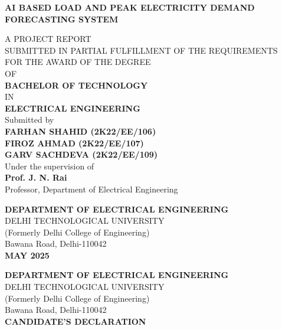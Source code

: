 \documentclass[12pt,a4paper,openany]{report}
\begin{document}
\thispagestyle{empty}
\begin{center}
\vspace*{6pt}
{\fontsize{18}{22}\selectfont\bfseries AI BASED LOAD AND PEAK ELECTRICITY DEMAND FORECASTING SYSTEM\par}
\vspace{14pt}

A PROJECT REPORT\\[2pt]
SUBMITTED IN PARTIAL FULFILLMENT OF THE REQUIREMENTS\\[2pt]
FOR THE AWARD OF THE DEGREE\\[2pt]
OF\\[2pt]
\textbf{BACHELOR OF TECHNOLOGY}\\[2pt]
IN\\[2pt]
\textbf{ELECTRICAL ENGINEERING}\\

\vspace{30pt}
Submitted by\\[10pt]
\textbf{FARHAN SHAHID (2K22/EE/106)}\\[4pt]
\textbf{FIROZ AHMAD (2K22/EE/107)}\\[4pt]
\textbf{GARV SACHDEVA (2K22/EE/109)}\\

\vspace{30pt}
Under the supervision of\\[6pt]
\textbf{Prof. J. N. Rai}\\
Professor, Department of Electrical Engineering

\vfill
\textbf{DEPARTMENT OF ELECTRICAL ENGINEERING}\\[2pt]
DELHI TECHNOLOGICAL UNIVERSITY\\[2pt]
(Formerly Delhi College of Engineering)\\[2pt]
Bawana Road, Delhi-110042\\[6pt]
\textbf{MAY 2025}
\end{center}

\newpage
{}

\begin{center}
\textbf{DEPARTMENT OF ELECTRICAL ENGINEERING}\\[2pt]
DELHI TECHNOLOGICAL UNIVERSITY\\[2pt]
(Formerly Delhi College of Engineering)\\[2pt]
Bawana Road, Delhi-110042\\[14pt]
\textbf{CANDIDATE'S DECLARATION}
\end{center}
\vspace{10pt}
\end{document}
